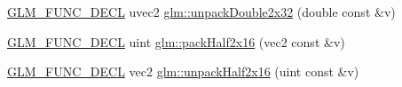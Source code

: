 \begin{DoxyCompactItemize}
\item 
\hyperlink{setup_8hpp_ab2d052de21a70539923e9bcbf6e83a51}{G\+L\+M\+\_\+\+F\+U\+N\+C\+\_\+\+D\+E\+CL} uvec2 \hyperlink{group__core__func__packing_ga7e8cf88c278c18969c99af83bceed024}{glm\+::unpack\+Double2x32} (double const \&v)
\item 
\hyperlink{setup_8hpp_ab2d052de21a70539923e9bcbf6e83a51}{G\+L\+M\+\_\+\+F\+U\+N\+C\+\_\+\+D\+E\+CL} uint \hyperlink{group__core__func__packing_ga082f6dd65f73a547ed3067ef00be036f}{glm\+::pack\+Half2x16} (vec2 const \&v)
\item 
\hyperlink{setup_8hpp_ab2d052de21a70539923e9bcbf6e83a51}{G\+L\+M\+\_\+\+F\+U\+N\+C\+\_\+\+D\+E\+CL} vec2 \hyperlink{group__core__func__packing_ga4051804cc2c930ba4ca73382b79edf1d}{glm\+::unpack\+Half2x16} (uint const \&v)
\end{DoxyCompactItemize}
